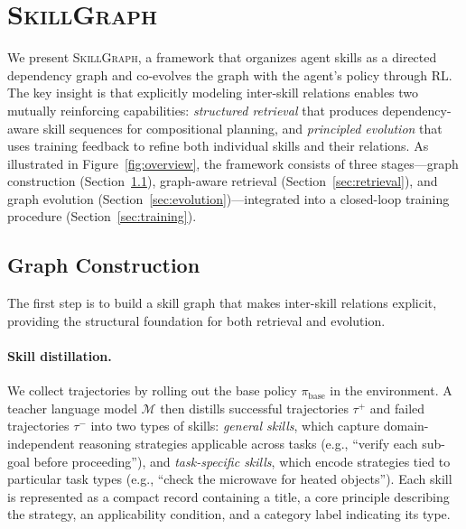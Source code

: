 \section{\textsc{SkillGraph}}
\label{sec:method}

We present \textsc{SkillGraph}, a framework that organizes agent skills as a directed dependency graph and co-evolves the graph with the agent's policy through RL. The key insight is that explicitly modeling inter-skill relations enables two mutually reinforcing capabilities: \emph{structured retrieval} that produces dependency-aware skill sequences for compositional planning, and \emph{principled evolution} that uses training feedback to refine both individual skills and their relations. As illustrated in Figure~\ref{fig:overview}, the framework consists of three stages---graph construction (Section~\ref{sec:construction}), graph-aware retrieval (Section~\ref{sec:retrieval}), and graph evolution (Section~\ref{sec:evolution})---integrated into a closed-loop training procedure (Section~\ref{sec:training}).

\subsection{Graph Construction}
\label{sec:construction}

The first step is to build a skill graph that makes inter-skill relations explicit, providing the structural foundation for both retrieval and evolution.

\paragraph{Skill distillation.}
We collect trajectories by rolling out the base policy $\pi_{\text{base}}$ in the environment. A teacher language model $\mathcal{M}$ then distills successful trajectories $\tau^+$ and failed trajectories $\tau^-$ into two types of skills: \emph{general skills}, which capture domain-independent reasoning strategies applicable across tasks (e.g., ``verify each sub-goal before proceeding''), and \emph{task-specific skills}, which encode strategies tied to particular task types (e.g., ``check the microwave for heated objects''). Each skill is represented as a compact record containing a title, a core principle describing the strategy, an applicability condition, and a category label indicating its type.

